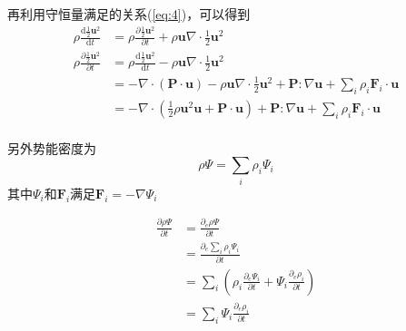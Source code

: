 \documentclass[10pt,aspectratio=43,mathserif,table]{ctexbeamer}
\newcommand{\customref}[1]{(\ref{#1})}
\begin{document}
\begin{frame}
    再利用守恒量满足的关系\customref{eq:4}，可以得到
    $$
    \begin{aligned}
        \rho \frac{\mathrm{d}\frac{1}{2}\mathbf{u}^2}{\mathrm{d}t}&=\rho \frac{\partial \frac{1}{2}\mathbf{u}^2}{\partial t}+\rho \mathbf{u}\nabla \cdot \frac{1}{2}\mathbf{u}^2\\
        \rho \frac{\partial \frac{1}{2}\mathbf{u}^2}{\partial t}&=\rho \frac{\mathrm{d}\frac{1}{2}\mathbf{u}^2}{\mathrm{d}t}-\rho \mathbf{u}\nabla \cdot \frac{1}{2}\mathbf{u}^2\\
        &=-\nabla \cdot \left( \mathbf{P}\cdot \mathbf{u} \right) -\rho \mathbf{u}\nabla \cdot \frac{1}{2}\mathbf{u}^2+\mathbf{P}:\nabla \mathbf{u}+\sum_i{\rho _i\mathbf{F}_i\cdot \mathbf{u}}\\
        &=-\nabla \cdot \left( \frac{1}{2}\rho \mathbf{u}^2\mathbf{u}+\mathbf{P}\cdot \mathbf{u} \right) +\mathbf{P}:\nabla \mathbf{u}+\sum_i{\rho _i\mathbf{F}_i\cdot \mathbf{u}}\\
    \end{aligned}
    $$

\end{frame}

\begin{frame}
    另外势能密度为
    $$
    \rho \varPsi =\sum_i{\rho _i\varPsi _i}
    $$
    其中$\varPsi _i$和$\mathbf{F}_i$满足$\mathbf{F}_i=-\nabla \varPsi _i$

    $$
    \begin{aligned}
        \frac{\partial \rho \varPsi}{\partial t}&=\frac{\partial _e\rho \varPsi}{\partial t}\\
        &=\frac{\partial _e\sum_i{\rho _i\varPsi _i}}{\partial t}\\
        &=\sum_i{\left( \rho _i\frac{\partial _e\varPsi _i}{\partial t}+\varPsi _i\frac{\partial _e\rho _i}{\partial t} \right)}\\
        &=\sum_i{\varPsi _i\frac{\partial _e\rho _i}{\partial t}}\\
    \end{aligned}
    $$

\end{frame}
\end{document}
